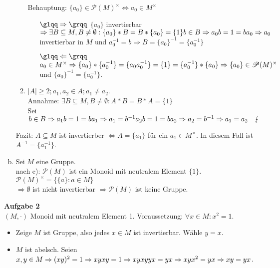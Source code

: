 \documentclass{article}
\begin{document}
\begin{enumerate}[a)]
\begin{enumerate}[1.{Fall}]
Behauptung: $\{a_0\} \in \mathscr{P}(M)^\times \Leftrightarrow a_0 \in M^\times$
\begin{itemize}
\item[$\glqq\Rightarrow\grqq$ ]$\{a_0\}$ invertierbar $\Rightarrow\exists B\subseteq M, B\neq\emptyset : \{a_0\}*B = B*\{a_0\} = \{1\}\\
b\in B \Rightarrow a_0b = 1 = ba_0\Rightarrow a_0$ invertierbar in $M$ und $a_0^{-1} = b \Rightarrow B = \{a_0\}^{-1} = \{a_0^{-1}\}$
\item[$\glqq\Leftarrow\grqq$ ] $a_0 \in M^\times\\
\Rightarrow\{a_0\}*\{a_0^{-1}\} = \{a_0a_0^{-1}\} = \{1\} = \{a_0^{-1}\}*\{a_0\}\\
\Rightarrow \{a_0\} \in\mathscr{P}(M)^\times$ und $\{a_0\}^{-1} = \{a_0^{-1}\}$.
\end{itemize}
\item $|A| \geq 2; a_1,a_2\in A; a_1\neq a_2$.\\
Annahme: $\exists B\subseteq M, B\neq\emptyset : A*B = B*A = \{1\}$\\
Sei $b\in B \Rightarrow a_1b = 1 = ba_1 \Rightarrow a_1 = b^{-1}\\
a_2b = 1 = ba_2 \Rightarrow a_2 = b^{-1} \Rightarrow a_1 = a_2\quad\lightning$\\
\end{enumerate}
Fazit: $A\subseteq M$ ist invertierber $\Leftrightarrow A = \{a_1\}$ für ein $a_1\in M^\times$. In diesem Fall ist $A^{-1} = \{a_1^{-1}\}$.
\item Sei $M$ eine Gruppe.\\
nach c): $\mathscr{P}(M)$ ist ein Monoid mit neutralem Element $\{1\}$.\\
$\mathscr{P}(M)^\times = \{\{a\}:a \in M\}$\\
$\Rightarrow \emptyset$ ist nicht invertierbar $\Rightarrow \mathscr{P}(M)$ ist keine Gruppe.
\end{enumerate}

\textbf{Aufgabe 2}\\
$(M,\cdot )$ Monoid mit neutralem Element 1. Voraussetzung: $\forall x\in M: x^2 = 1$.\\
\begin{itemize}
\item Zeige $M$ ist Gruppe, also jedes $x\in M$ ist invertierbar. Wähle $y=x$.
\item $M$ ist abelsch. Seien $x,y\in M \Rightarrow (xy)^2 = 1 \Rightarrow xyxy = 1 \Rightarrow xyxyyx = yx \Rightarrow xyx^2 = yx \\
\Rightarrow xy = yx$.\\
\end{itemize}
\end{document}
